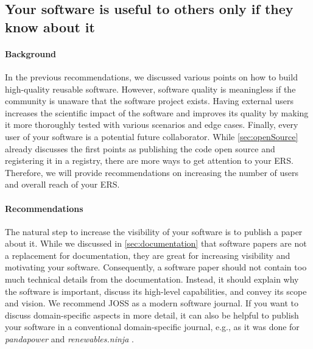 \subsection{Your software is useful to others only if they know about it}
\label{sec:community}

\paragraph{Background} In the previous recommendations, we discussed various points on how to build high-quality reusable software. However, software quality is meaningless if the community is unaware that the software project exists.
Having external users increases the scientific impact of the software and improves its quality by making it more thoroughly tested with various scenarios and edge cases. Finally, every user of your software is a potential future collaborator.
While \ref{sec:openSource} already discusses the first points as publishing the code open source and registering it in a registry, there are more ways to get attention to your \ac{ERS}.
Therefore, we will provide recommendations on increasing the number of users and overall reach of your \ac{ERS}.
\par 

\paragraph{Recommendations} The natural step to increase the visibility of your software is to publish a paper about it. While we discussed in \ref{sec:documentation} that software papers are not a replacement for documentation, they are great for increasing visibility and motivating your software. Consequently, a software paper should not contain too much technical details from the documentation. Instead, it should explain why the software is important, discuss its high-level capabilities, and convey its scope and vision. We recommend \ac{JOSS} \cite{jossJournal} as a modern software journal. If you want to discuss domain-specific aspects in more detail, it can also be helpful to publish your software in a conventional domain-specific journal, e.g., as it was done for \textit{pandapower} \cite{pandapower2018} and \textit{renewables.ninja} \cite{pfenninger_long-term_2016}.


